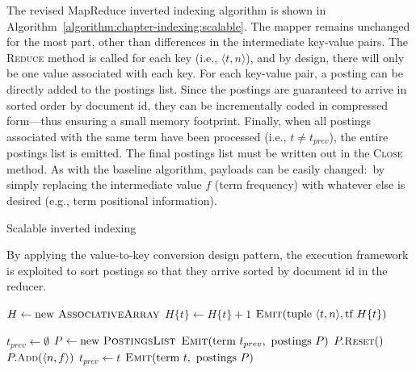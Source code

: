 The revised MapReduce inverted indexing algorithm is shown in
Algorithm~\ref{algorithm:chapter-indexing:scalable}.  The mapper remains unchanged
for the most part, other than differences in the intermediate
key-value pairs.  The \textsc{Reduce} method is called for each key
(i.e., $\langle t, n \rangle$), and by design, there will only be one
value associated with each key.  For each key-value pair, a posting
can be directly added to the postings list.  Since the postings are
guaranteed to arrive in sorted order by document id, they can be
incrementally coded in compressed form---thus ensuring a small
memory footprint.  Finally, when all postings associated with the same
term have been processed (i.e., $t \ne t_{prev}$), the entire postings
list is emitted.  The final postings list must be written out in the
\textsc{Close} method.  As with the baseline algorithm, payloads can
be easily changed:\ by simply replacing the intermediate value $f$
(term frequency) with whatever else is desired (e.g., term positional
information).

\begin{algorithm}[t]
\caption{Scalable inverted indexing}
\label{algorithm:chapter-indexing:scalable}
By applying the value-to-key conversion design pattern, the execution
framework is exploited to sort postings so that they arrive sorted by
document id in the reducer.

\algrenewcommand{}
\algrenewcommand{}
  \begin{algorithmic}[1]
    \State $H \gets \textrm{new }\textsc{AssociativeArray}$
    \State $H\{t\} \gets H\{t\} + 1$
    \EndFor
    \State $\textsc{Emit}(\textrm{tuple }\langle t, n \rangle, \textrm{tf }H\{t\} )$
    \EndFor
    \EndProcedure
    \EndFunction
  \end{algorithmic}

  \begin{algorithmic}[1]
      \State $t_{prev} \gets \emptyset$
      \State $P \gets \textrm{new }\textsc{PostingsList}$
    \EndProcedure
      \State $\textsc{Emit}(\textrm{term }t_{prev}, \textrm{ postings } P)$
      \State $P.\textsc{{\small Reset}}()$
    \EndIf
    \State $P.\textsc{{\small Add}}(\langle n, f \rangle)$
    \State $t_{prev} \gets t$
    \EndProcedure
      \State $\textsc{Emit}(\textrm{term }t, \textrm{ postings } P)$
    \EndProcedure
    \EndFunction
  \end{algorithmic}
\end{algorithm}

